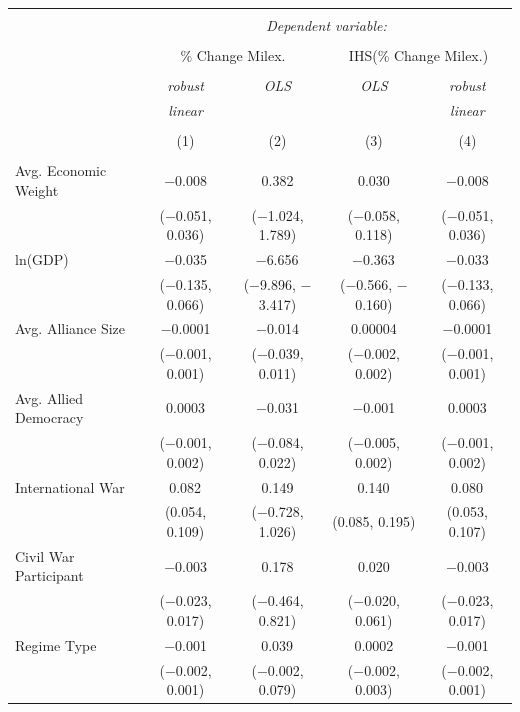 \documentclass[12pt]{article}
\begin{document}
\begin{table}[!htbp] \centering 
\begin{adjustbox}{width= .95\textwidth, center}
\begin{tabular}{@{\extracolsep{0pt}}lcccc} 
\\[-1.8ex]\hline 
\hline \\[-1.8ex] 
 & \multicolumn{4}{c}{\textit{Dependent variable:}} \\ 
\cline{2-5} 
\\[-1.8ex] & \multicolumn{2}{c}{\% Change Milex.} & \multicolumn{2}{c}{IHS(\% Change Milex.)} \\ 
\\[-1.8ex] & \textit{robust} & \textit{OLS} & \textit{OLS} & \textit{robust} \\ 
 & \textit{linear} & \textit{} & \textit{} & \textit{linear} \\ 
\\[-1.8ex] & (1) & (2) & (3) & (4)\\ 
\hline \\[-1.8ex] 
 Avg. Economic Weight & $-$0.008 & 0.382 & 0.030 & $-$0.008 \\ 
  & ($-$0.051, 0.036) & ($-$1.024, 1.789) & ($-$0.058, 0.118) & ($-$0.051, 0.036) \\ 
  ln(GDP) & $-$0.035 & $-$6.656$^{}$ & $-$0.363$^{}$ & $-$0.033 \\ 
  & ($-$0.135, 0.066) & ($-$9.896, $-$3.417) & ($-$0.566, $-$0.160) & ($-$0.133, 0.066) \\ 
  Avg. Alliance Size & $-$0.0001 & $-$0.014 & 0.00004 & $-$0.0001 \\ 
  & ($-$0.001, 0.001) & ($-$0.039, 0.011) & ($-$0.002, 0.002) & ($-$0.001, 0.001) \\ 
  Avg. Allied Democracy & 0.0003 & $-$0.031 & $-$0.001 & 0.0003 \\ 
  & ($-$0.001, 0.002) & ($-$0.084, 0.022) & ($-$0.005, 0.002) & ($-$0.001, 0.002) \\ 
  International War & 0.082$^{}$ & 0.149 & 0.140$^{}$ & 0.080$^{}$ \\ 
  & (0.054, 0.109) & ($-$0.728, 1.026) & (0.085, 0.195) & (0.053, 0.107) \\ 
  Civil War Participant & $-$0.003 & 0.178 & 0.020 & $-$0.003 \\ 
  & ($-$0.023, 0.017) & ($-$0.464, 0.821) & ($-$0.020, 0.061) & ($-$0.023, 0.017) \\ 
  Regime Type & $-$0.001 & 0.039$^{}$ & 0.0002 & $-$0.001 \\ 
  & ($-$0.002, 0.001) & ($-$0.002, 0.079) & ($-$0.002, 0.003) & ($-$0.002, 0.001) \\ 

\end{tabular}
\end{adjustbox}
\end{table}
\end{document}
